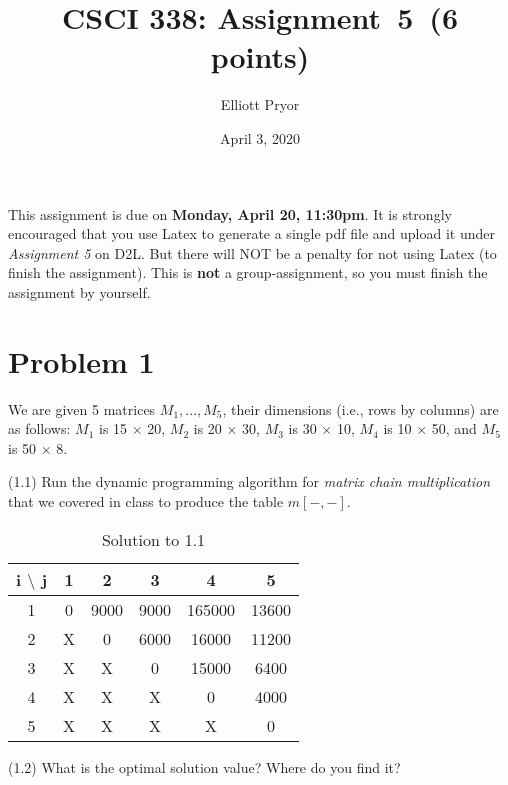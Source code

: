 \documentclass[11pt]{article}
\begin{document}
\date{April 3, 2020}
\title{CSCI 338: Assignment~5~(6 points)}

\author{Elliott Pryor}


\maketitle

\noindent
This assignment is due on {\bf Monday, April 20, 11:30pm}. It is strongly
encouraged that you use Latex to generate a single pdf file and upload it
under {\em Assignment 5} on D2L. But there will NOT be a penalty for not
using Latex (to finish the assignment). This is {\bf not} a group-assignment,
so you must finish the assignment by yourself.

\section*{Problem 1}

\noindent
We are given 5 matrices $M_1,...,M_5$, their dimensions (i.e., rows by columns)
are as follows: 
$M_1$ is 15 $\times$ 20,
$M_2$ is 20 $\times$ 30,
$M_3$ is 30 $\times$ 10,
$M_4$ is 10 $\times$ 50, and
$M_5$ is 50 $\times$ 8.
\newline

\noindent
(1.1) Run the dynamic programming algorithm for {\em matrix chain multiplication} that we covered in class to produce the table $m[-,-]$.


\begin{table}[H]
    \centering
    \begin{tabular}{c|c c c c c}
       i $\setminus$ j  & 1 & 2 & 3 & 4 & 5 \\
       \hline
       1 & 0 & 9000 & 9000 & 165000 & 13600 \\
       2 & X & 0 & 6000 & 16000 & 11200 \\
       3 & X & X & 0 & 15000 & 6400 \\
       4 & X & X & X & 0 & 4000\\
       5 & X & X & X & X & 0 \\
    \end{tabular}
    \caption{Solution to 1.1}
    \label{tab:1.1}
\end{table}


\noindent
(1.2) What is the optimal solution value? Where do you find it? 
\end{document}
